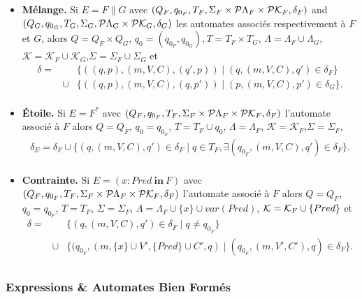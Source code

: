 \begin{itemize}
  \item \textbf{M\'elange.} Si $E = F \parallel G$ avec $(Q_F,q_{0_F},T_F,
  \Sigma_F  \times{}{\cal P}\Lambda_F \times{}{\cal P}\mathcal{K}_F,\delta_F)$ and
  $(Q_G,q_{0_G}, T_G,\Sigma_G,
  {\cal P}\Lambda_G \times{}{\cal P}\mathcal{K}_G,\delta_G)$ les automates associ\'es
  respectivement \`a $F$ et  $G$, alors
   $Q = Q_F \times{}Q_G$, $q_0 = (q_{0_F},q_{0_G}),
   T = T_F \times{}T_G$,
    $\Lambda=\Lambda_F\cup \Lambda_G$,$\mathcal{K}=\mathcal{K}_F\cup \mathcal{K}_G$,$\Sigma = \Sigma_F \cup \Sigma_G$ et
    \[
    \begin{array}{rcl}
        \delta=&& \{((q,p),(m,V,C),(q',p)) \mid (q,(m,V,C),q') \in \delta_F\}\\
        &\cup&\{((q,p),(m,V,C),(q,p')) \mid (p,(m,V,C),p') \in \delta_G\}. \\
    \end{array}
    \]
  \item \textbf{\'Etoile.} Si $E = F^*$ avec $(Q_F,q_{0_F},T_F,
  \Sigma_F  \times{}{\cal P}\Lambda_F \times{}{\cal P}\mathcal{K}_F,\delta_F)$
   l'automate associ\'e \`a $F$ alors $Q = Q_F $, $q_0 = q_{0_F}$,
  $T = T_F \cup q_0$, $\Lambda=\Lambda_F$, $\mathcal{K}=\mathcal{K}_F$,$\Sigma = \Sigma_F$,
    \[
    \begin{array}{r}
        \delta_E = \delta_F \cup \{(q,(m,V,C),q') \in \delta_F \mid q\in T_F,\exists (q_{0_F},(m,V,C),q') \in \delta_F\}.\\
    \end{array}
    \]
  \item \textbf{Contrainte.} Si $E=(x:Pred ~\mathbf{in}~F)$ avec $(Q_F,q_{0_F},T_F,
  \Sigma_F  \times{}{\cal P}\Lambda_F \times{}{\cal P}\mathcal{K}_F,\delta_F)$ l'automate
  associ\'e \`a $F$ alors $Q =
    Q_F$, $q_0 = q_{0_F}$, $T = T_F$, $\Sigma = \Sigma_F$, $\Lambda =
  \Lambda_F \cup \{x\} \cup var(Pred)$, ${\cal K} = {\cal K}_F \cup \{Pred\}$ et
    \[
    \begin{array}{rcl}
    \delta = &&\{(q,(m,V,C),q') \in \delta_F \mid q \neq q_{0_F} \} \\
    & \cup &
    \{(q_{0_F},(m,\{x\} \cup V',
    \{Pred\} \cup C',q) \mid (q_{0_F},(m,V',C'),q) \in \delta_F \}.\\
    \end{array}
    \]
\end{itemize}

\subsubsection{Expressions \& Automates Bien Form\'es}

